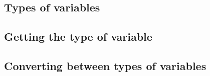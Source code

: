 
\subsection{Types of variables}

\subsection{Getting the type of variable}

\subsection{Converting between types of variables}


